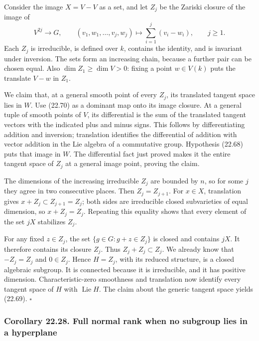 \documentclass[
  11pt,
  a4paper,
]{article}
\begin{document}
Consider the image \(X=V-V\) as a set, and let \(Z_j\) be the Zariski
closure of the image of \[
 V^{2j}\longrightarrow G,\qquad
 (v_1,w_1,\ldots,v_j,w_j)\longmapsto
       \sum_{i=1}^j(v_i-w_i),\qquad j\ge1.
 \tag{22.70}
\] Each \(Z_j\) is irreducible, is defined over \(k\), contains the
identity, and is invariant under inversion. The sets form an increasing
chain, because a further pair can be chosen equal. Also
\(\dim Z_1\ge\dim V>0\): fixing a point \(w\in V(k)\) puts the translate
\(V-w\) in \(Z_1\).

We claim that, at a general smooth point of every \(Z_j\), its
translated tangent space lies in \(W\). Use (22.70) as a dominant map
onto its image closure. At a general tuple of smooth points of \(V\),
its differential is the sum of the translated tangent vectors with the
indicated plus and minus signs. This follows by differentiating addition
and inversion; translation identifies the differential of addition with
vector addition in the Lie algebra of a commutative group. Hypothesis
(22.68) puts that image in \(W\). The differential fact just proved
makes it the entire tangent space of \(Z_j\) at a general image point,
proving the claim.

The dimensions of the increasing irreducible \(Z_j\) are bounded by
\(n\), so for some \(j\) they agree in two consecutive places. Then
\(Z_j=Z_{j+1}\). For \(x\in X\), translation gives
\(x+Z_j\subset Z_{j+1}=Z_j\); both sides are irreducible closed
subvarieties of equal dimension, so \(x+Z_j=Z_j\). Repeating this
equality shows that every element of the set \(jX\) stabilizes \(Z_j\).

For any fixed \(z\in Z_j\), the set \(\{g\in G:g+z\in Z_j\}\) is closed
and contains \(jX\). It therefore contains its closure \(Z_j\). Thus
\(Z_j+Z_j\subset Z_j\). We already know that \(-Z_j=Z_j\) and
\(0\in Z_j\). Hence \(H=Z_j\), with its reduced structure, is a closed
algebraic subgroup. It is connected because it is irreducible, and it
has positive dimension. Characteristic-zero smoothness and translation
now identify every tangent space of \(H\) with \(\operatorname{Lie}H\).
The claim about the generic tangent space yields (22.69). \(\square\)

\subsubsection{Corollary 22.28. Full normal rank when no subgroup lies
in a
hyperplane}\label{corollary-22.28.-full-normal-rank-when-no-subgroup-lies-in-a-hyperplane}
\end{document}
